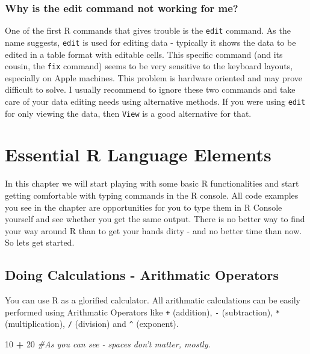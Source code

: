 \documentclass[
]{krantz}
\makeatletter
\newenvironment{Shaded}{\begin{snugshade}}{\end{snugshade}}
\newcommand{\CommentTok}[1]{\textcolor[rgb]{0.37,0.37,0.37}{\textit{#1}}}
\newcommand{\DecValTok}[1]{\textcolor[rgb]{0.06,0.06,0.06}{#1}}
\newcommand{\OperatorTok}[1]{\textcolor[rgb]{0.43,0.43,0.43}{\textbf{#1}}}
\newcommand{\StringTok}[1]{\textcolor[rgb]{0.5,0.5,0.5}{#1}}
\newenvironment{kframe}{%
\medskip{}
\setlength{\fboxsep}{.8em}
 \def\at@end@of@kframe{}%
 \ifinner\ifhmode%
  \def\at@end@of@kframe{\end{minipage}}%
  \begin{minipage}{\columnwidth}%
 \fi\fi%
 \def\FrameCommand##1{\hskip\@totalleftmargin \hskip-\fboxsep
 \colorbox{shadecolor}{##1}\hskip-\fboxsep
     \hskip-\linewidth \hskip-\@totalleftmargin \hskip\columnwidth}%
 \MakeFramed {\advance\hsize-\width
   \@totalleftmargin\z@ \linewidth\hsize
   \@setminipage}}%
 {\par\unskip\endMakeFramed%
 \at@end@of@kframe}
\renewenvironment{Shaded}{\begin{kframe}}{\end{kframe}}
\makeatother
\begin{document}
\hypertarget{why-is-the-edit-command-not-working-for-me}{%
\subsection{Why is the edit command not working for me?}\label{why-is-the-edit-command-not-working-for-me}}

One of the first R commands that gives trouble is the \texttt{edit} command. As the name suggests, \texttt{edit} is used for editing data - typically it shows the data to be edited in a table format with editable cells. This specific command (and its cousin, the \texttt{fix} command) seems to be very sensitive to the keyboard layouts, especially on Apple machines. This problem is hardware oriented and may prove difficult to solve. I usually recommend to ignore these two commands and take care of your data editing needs using alternative methods. If you were using \texttt{edit} for only viewing the data, then \texttt{View} is a good alternative for that.

\hypertarget{essential-r-language-elements}{%
\chapter{Essential R Language Elements}\label{essential-r-language-elements}}

In this chapter we will start playing with some basic R functionalities and start getting comfortable with typing commands in the R console. All code examples you see in the chapter are opportunities for you to type them in R Console yourself and see whether you get the same output. There is no better way to find your way around R than to get your hands dirty - and no better time than now. So lets get started.

\hypertarget{doing-calculations---arithmatic-operators}{%
\section{Doing Calculations - Arithmatic Operators}\label{doing-calculations---arithmatic-operators}}

You can use R as a glorified calculator. All arithmatic calculations can be easily performed using Arithmatic Operators like \texttt{+} (addition), \texttt{-} (subtraction), \texttt{*} (multiplication), \texttt{/} (division) and \texttt{\^{}} (exponent).

\begin{Shaded}
\begin{Highlighting}[]
\DecValTok{10}  \OperatorTok{+}\StringTok{    }\DecValTok{20}  \CommentTok{#As you can see - spaces don't matter, mostly.}
\end{Highlighting}
\end{Shaded}
\end{document}

